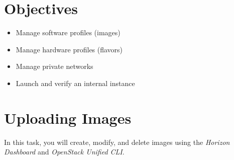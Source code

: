 \documentclass[letterpaper, 12pt]{article}
\begin{document}
\section*{Objectives}
\label{sec:objectives}
\begin{itemize}[itemsep=0pt]
    \item Manage software profiles (images)
    \item Manage hardware profiles (flavors)
    \item Manage private networks
    \item Launch and verify an internal instance
\end{itemize}

\section{Uploading Images}
\label{sec:uploading_images}
In this task, you will create, modify, and delete images using the \textit{Horizon Dashboard} and
\textit{OpenStack Unified CLI}.
\end{document}
